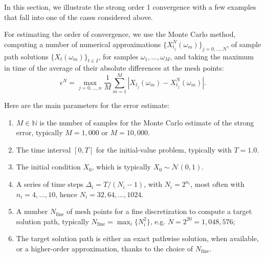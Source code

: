\documentclass[reqno,12pt]{amsart}
\theoremstyle{plain}%
\theoremstyle{definition}
\begin{document}
In this section, we illustrate the strong order 1 convergence with a few examples that fall into one of the cases considered above.

For estimating the order of convergence, we use the Monte Carlo method, computing a number of numerical approximations $\{X_{t_j}^N(\omega_m)\}_{j=0, \ldots, N}$, of sample path solutions $\{X_t(\omega_m)\}_{t\in I}$, for samples $\omega_1, \ldots, \omega_M$, and taking the maximum in time of the average of their absolute differences at the mesh points:
\begin{equation}
    \epsilon^N = \max_{j=0, \ldots, n} \frac{1}{M}\sum_{m=1}^M \left|X_{t_j}(\omega_m) - X_{t_j}^N(\omega_m)\right|.
\end{equation}

Here are the main parameters for the error estimate:
\begin{enumerate}
    \item $M\in\mathbb{N}$ is the number of samples for the Monte Carlo estimate of the strong error, typically $M=1,000$ or $M=10,000$.
    \item The time interval $[0, T]$ for the initial-value problem, typically with $T=1.0$.
    \item The initial condition $X_0$, which is typically $X_0 \sim \mathcal{N}(0, 1)$.
    \item A series of time steps $\Delta_i = T/(N_i-1)$, with $N_i=2^{n_i}$, most often with $n_i=4, \ldots, 10$, hence $N_i=32, 64, \ldots, 1024$.
    \item A number $N_{\mathrm{fine}}$ of mesh points for a fine discretization to compute a target solution path, typically $N_{\mathrm{fine}} = \max_i\{N_i^2\}$, e.g. $N=2^{20} = 1,048,576$;
    \item The target solution path is either an exact pathwise solution, when available, or a higher-order approximation, thanks to the choice of $N_{\mathrm{fine}}$.
\end{enumerate}
\end{document}
